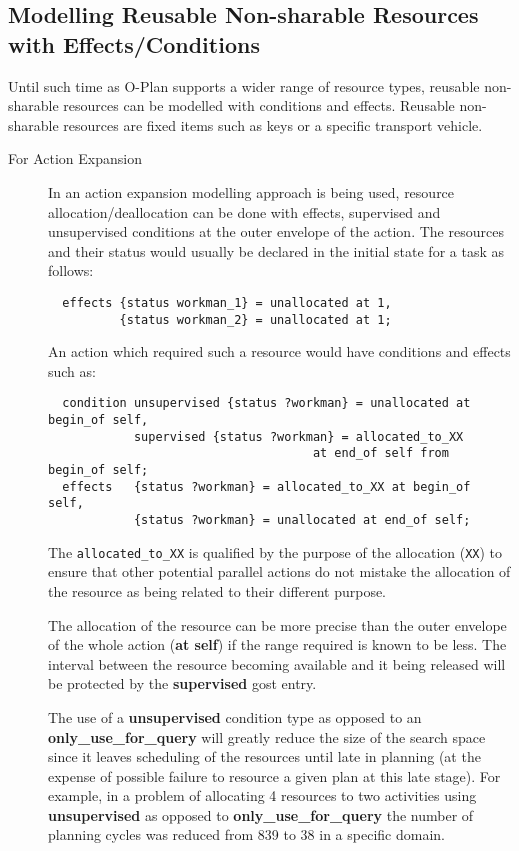 \subsection{Modelling Reusable Non-sharable Resources with Effects/Conditions}

Until such time as O-Plan supports a wider range of resource types, reusable
non-sharable resources can be modelled with conditions and effects.
Reusable non-sharable resources are fixed items such as keys or a specific
transport vehicle.

\begin{description}
\item[For Action Expansion]
In an action expansion modelling approach is being used, resource
allocation/deallocation can be done with effects, supervised and unsupervised
conditions at the outer envelope of the action.  The resources and their
status would usually be declared in the initial state for a task as follows:

\begin{verbatim} 
  effects {status workman_1} = unallocated at 1,
          {status workman_2} = unallocated at 1;
\end{verbatim}

An action which required such a resource would have conditions and effects
such as:

\begin{verbatim} 
  condition unsupervised {status ?workman} = unallocated at begin_of self,
            supervised {status ?workman} = allocated_to_XX
                                     at end_of self from begin_of self;
  effects   {status ?workman} = allocated_to_XX at begin_of self,
            {status ?workman} = unallocated at end_of self;
\end{verbatim} 

The {\tt allocated\_to\_XX} is qualified by the purpose of the allocation
({\tt XX}) to ensure that other potential parallel actions do not mistake the
allocation of the resource as being related to their different purpose.

The allocation of the resource can be more precise than the outer envelope of
the whole action ({\bf at self}) if the range required is known to be less.
The interval between the resource becoming available and it being released
will be protected by the {\bf supervised} {\sc gost} entry.

The use of a {\bf unsupervised} condition type as opposed to an {\bf
only\_use\_for\_query} will greatly reduce the size of the search space since
it leaves scheduling of the resources until late in planning (at the expense
of possible failure to resource a given plan at this late stage).  For
example, in a problem of allocating 4 resources to two activities using {\bf
unsupervised} as opposed to {\bf only\_use\_for\_query} the number of
planning cycles was reduced from 839 to 38 in a specific domain.


\end{description}
